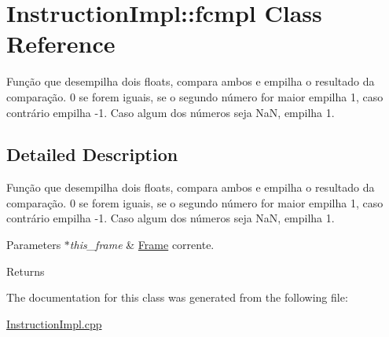 \hypertarget{class_instruction_impl_1_1fcmpl}{}\section{Instruction\+Impl\+:\+:fcmpl Class Reference}
\label{class_instruction_impl_1_1fcmpl}


Função que desempilha dois floats, compara ambos e empilha o resultado da comparação. 0 se forem iguais, se o segundo número for maior empilha 1, caso contrário empilha -\/1. Caso algum dos números seja NaN, empilha 1.  




\subsection{Detailed Description}
Função que desempilha dois floats, compara ambos e empilha o resultado da comparação. 0 se forem iguais, se o segundo número for maior empilha 1, caso contrário empilha -\/1. Caso algum dos números seja NaN, empilha 1. 


\begin{DoxyParams}{Parameters}
{\em $\ast$this\+\_\+frame} & \hyperlink{struct_frame}{Frame} corrente. \\
\hline
\end{DoxyParams}
\begin{DoxyReturn}{Returns}

\end{DoxyReturn}


The documentation for this class was generated from the following file\+:\begin{DoxyCompactItemize}
\item 
\hyperlink{_instruction_impl_8cpp}{Instruction\+Impl.\+cpp}\end{DoxyCompactItemize}
